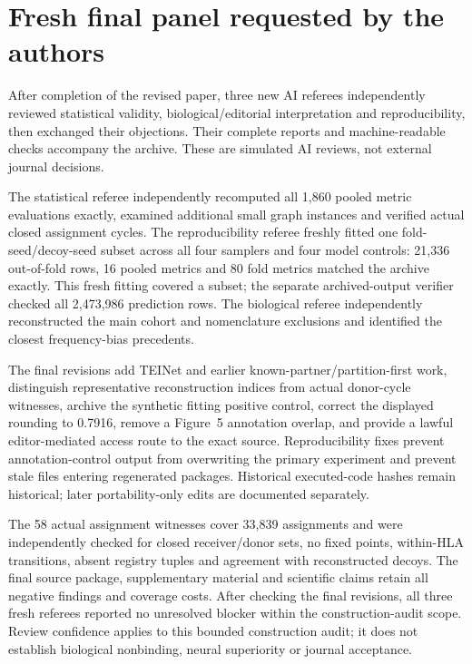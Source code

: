 \documentclass[11pt,a4paper]{article}
\begin{document}
\section{Fresh final panel requested by the authors}
After completion of the revised paper, three new AI referees independently reviewed statistical validity, biological/editorial interpretation and reproducibility, then exchanged their objections. Their complete reports and machine-readable checks accompany the archive. These are simulated AI reviews, not external journal decisions.

The statistical referee independently recomputed all 1,860 pooled metric evaluations exactly, examined additional small graph instances and verified actual closed assignment cycles. The reproducibility referee freshly fitted one fold-seed/decoy-seed subset across all four samplers and four model controls: 21,336 out-of-fold rows, 16 pooled metrics and 80 fold metrics matched the archive exactly. This fresh fitting covered a subset; the separate archived-output verifier checked all 2,473,986 prediction rows. The biological referee independently reconstructed the main cohort and nomenclature exclusions and identified the closest frequency-bias precedents.

The final revisions add TEINet and earlier known-partner/partition-first work, distinguish representative reconstruction indices from actual donor-cycle witnesses, archive the synthetic fitting positive control, correct the displayed rounding to 0.7916, remove a Figure~5 annotation overlap, and provide a lawful editor-mediated access route to the exact source. Reproducibility fixes prevent annotation-control output from overwriting the primary experiment and prevent stale files entering regenerated packages. Historical executed-code hashes remain historical; later portability-only edits are documented separately.

The 58 actual assignment witnesses cover 33,839 assignments and were independently checked for closed receiver/donor sets, no fixed points, within-HLA transitions, absent registry tuples and agreement with reconstructed decoys. The final source package, supplementary material and scientific claims retain all negative findings and coverage costs. After checking the final revisions, all three fresh referees reported no unresolved blocker within the construction-audit scope. Review confidence applies to this bounded construction audit; it does not establish biological nonbinding, neural superiority or journal acceptance.
\end{document}

